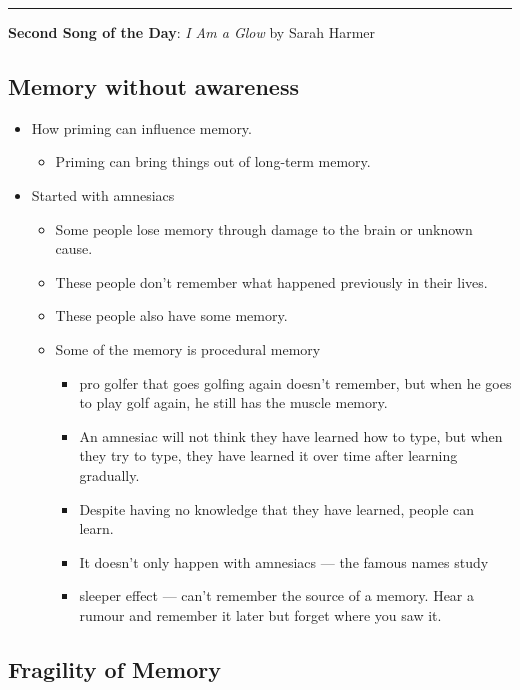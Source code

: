 \documentclass[12pt]{article}
\begin{document}
\vspace{1cm}
\hrule

\textbf{Second Song of the Day}: \emph{I Am a Glow} by Sarah Harmer

\subsection{Memory without awareness }

\begin{itemize}

	\item How priming can influence memory.
		\begin{itemize}
			\item Priming can bring things out of long-term memory.
		\end{itemize}
	\item Started with amnesiacs
		\begin{itemize}
			\item Some people lose memory through damage to the brain or unknown
				cause.
			\item These people don't remember what happened previously in their
				lives.
			\item These people also have some memory.
			\item Some of the memory is procedural memory
				\begin{itemize}
					\item pro golfer that goes golfing again doesn't remember,
						but when he goes to play golf again, he still has the
						muscle memory.
					\item An amnesiac will not think they have learned how to
						type, but when they try to type, they have learned it
						over time after learning gradually.
					\item Despite having no knowledge that they have learned,
						people can learn.
					\item It doesn't only happen with amnesiacs --- the famous
						names study
					\item sleeper effect --- can't remember the source of a
						memory. Hear a rumour and remember it later but forget
						where you saw it.
				\end{itemize}
		\end{itemize}
\end{itemize}

\subsection{Fragility of Memory }
\end{document}
